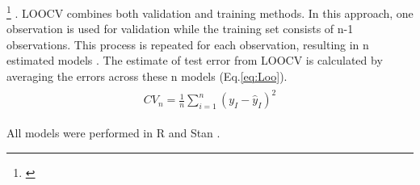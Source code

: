 \documentclass[12pt]{article}\usepackage[]{graphicx}\usepackage[dvipsnames]{xcolor}
\newcommand{\jacob}[2]{{\color{blue}{#1}}\footnote{\textit{\color{blue}{#2}}}}
\begin{document}
\jacob{To select the best model for each vital rate, we compared the four models using the leave-one-out cross-validation (LOOCV)} {I need to add something about  difference in  models} \citep{vehtari2017practical}. 
LOOCV combines both validation and training methods. 
In this approach, one observation is used for validation while the training set consists of n-1 observations. 
This process is repeated for each observation, resulting in n estimated models \citep{silva2024robust}. 
The estimate of test error from LOOCV is calculated by averaging the errors across these n models (Eq.\ref{eq:Loo}).
\begin{align}\label{eq:Loo}
\begin{split}
CV_{n}=\frac {1}{n} \sum^{n}_{i=1}{(y_{I}-\hat{y}_{I})^2}
\end{split}
\end{align}

All models were performed in R \citep{RCoreTeam} and Stan \citep{Rstan}.
\end{document}
